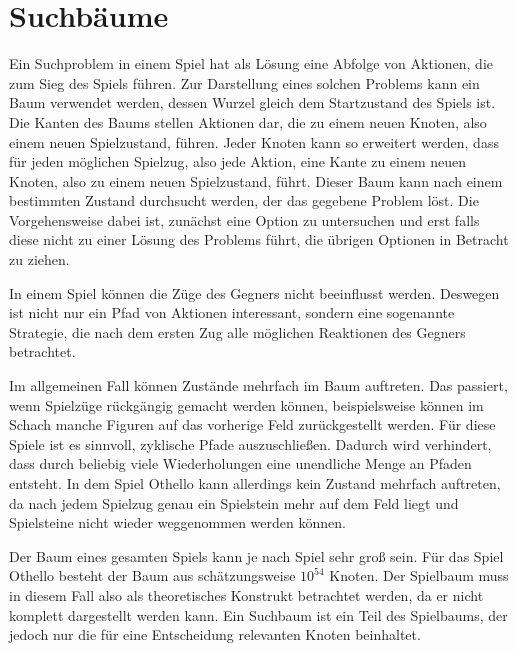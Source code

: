 \section{Suchbäume}

Ein Suchproblem in einem Spiel hat als Lösung eine Abfolge von Aktionen, die zum Sieg des Spiels führen.
Zur Darstellung eines solchen Problems kann ein Baum verwendet werden, dessen Wurzel gleich dem Startzustand des Spiels ist.
Die Kanten des Baums stellen Aktionen dar, die zu einem neuen Knoten, also einem neuen Spielzustand, führen.
Jeder Knoten kann so erweitert werden, dass für jeden möglichen Spielzug, also jede Aktion, eine Kante zu einem neuen Knoten, also zu einem neuen Spielzustand, führt.
Dieser Baum kann nach einem bestimmten Zustand durchsucht werden, der das gegebene Problem löst.
Die Vorgehensweise dabei ist, zunächst eine Option zu untersuchen und erst falls diese nicht zu einer Lösung des Problems führt, die übrigen Optionen in Betracht zu ziehen.
\cite[S.~75]{ai2010russel}

In einem Spiel können die Züge des Gegners nicht beeinflusst werden.
Deswegen ist nicht nur ein Pfad von Aktionen interessant, sondern eine sogenannte Strategie, die nach dem ersten Zug alle möglichen Reaktionen des Gegners betrachtet.
\cite[S.~163]{ai2010russel}

Im allgemeinen Fall können Zustände mehrfach im Baum auftreten.
Das passiert, wenn Spielzüge rückgängig gemacht werden können, beispielsweise können im Schach manche Figuren auf das vorherige Feld zurückgestellt werden.
Für diese Spiele ist es sinnvoll, zyklische Pfade auszuschließen. %
Dadurch wird verhindert, dass durch beliebig viele Wiederholungen eine unendliche Menge an Pfaden entsteht.
\cite[S.~75]{ai2010russel}
In dem Spiel Othello kann allerdings kein Zustand mehrfach auftreten, da nach jedem Spielzug genau ein Spielstein mehr auf dem Feld liegt und Spielsteine nicht wieder weggenommen werden können.

Der Baum eines gesamten Spiels kann je nach Spiel sehr groß sein.
Für das Spiel Othello besteht der Baum aus schätzungsweise $10^{54}$ Knoten. %
Der Spielbaum muss in diesem Fall also als theoretisches Konstrukt betrachtet werden, da er nicht komplett dargestellt werden kann.
Ein Suchbaum ist ein Teil des Spielbaums, der jedoch nur die für eine Entscheidung relevanten Knoten beinhaltet.
\cite[S.~162f.]{ai2010russel}
